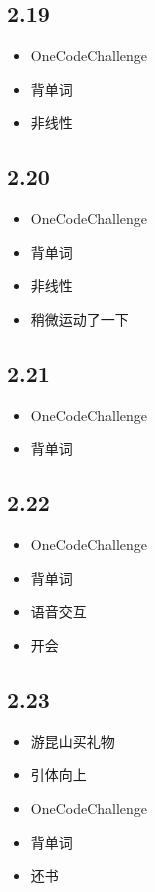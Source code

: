 \documentclass[UTF8]{ctexart}
\begin{document}
\subsection*{2.19}
\begin{itemize}
    \item OneCodeChallenge
    \item 背单词
    \item 非线性
\end{itemize}

\subsection*{2.20}
\begin{itemize}
    \item OneCodeChallenge
    \item 背单词
    \item 非线性
    \item 稍微运动了一下
\end{itemize}

\subsection*{2.21}
\begin{itemize}
    \item OneCodeChallenge
    \item 背单词
\end{itemize}

\subsection*{2.22}
\begin{itemize}
    \item OneCodeChallenge
    \item 背单词
    \item 语音交互
    \item 开会
\end{itemize}

\subsection*{2.23}
\begin{itemize}
    \item 游昆山买礼物
    \item 引体向上
    \item OneCodeChallenge
    \item 背单词
    \item 还书
\end{itemize}
\end{document}
